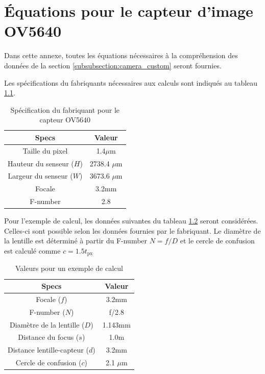 
%
%

\chapter{Équations pour le capteur d'image OV5640}
\label{annexe:equation_camera_custom}

Dans cette annexe, toutes les équations nécessaires à la compréhension des données de la section \ref{subsubsection:camera_custom} seront fournies.

Les spécifications du fabriquants nécessaires aux calculs sont indiqués au tableau \ref{t:specs_camera_custom}.

\begin{table}[!htb]
\footnotesize
\centering
    \begin{tabular}{|c|c|}
    \hline
    Specs & Valeur\\
    \hline\hline
    Taille du pixel & 1.4$\mu$m\\
    Hauteur du senseur ($H$) & 2738.4 $\mu$m\\
    Largeur du senseur ($W$) & 3673.6 $\mu$m\\
    Focale & 3.2mm\\
    F-number & 2.8\\
    \hline
    \end{tabular}
\caption{Spécification du fabriquant pour le capteur OV5640 \cite{OV5640}}
\label{t:specs_camera_custom}
\end{table}

Pour l'exemple de calcul, les données suivantes du tableau \ref{t:ex_calcul_camera_custom} seront considérées. Celles-ci sont possible selon les données fournies par le fabriquant. Le diamètre de la lentille est déterminé à partir du F-number $N=f/D$ et le cercle de confusion est calculé comme $c=1.5 t_\text{px}$
\begin{table}[!htb]
\footnotesize
\centering
    \begin{tabular}{|c|c|}
    \hline
    Specs & Valeur\\
    \hline\hline
    Focale ($f$) & 3.2mm\\
    F-number ($N$) & f/2.8\\
    Diamètre de la lentille ($D$) & 1.143mm\\
    Distance du focus ($s$) & 1.0m\\
    Distance lentille-capteur ($d$) & 3.2mm\\
    Cercle de confusion ($c$) &  2.1 $\mu$m\\
    \hline
    \end{tabular}
\caption{Valeurs pour un exemple de calcul}
\label{t:ex_calcul_camera_custom}
\end{table}

